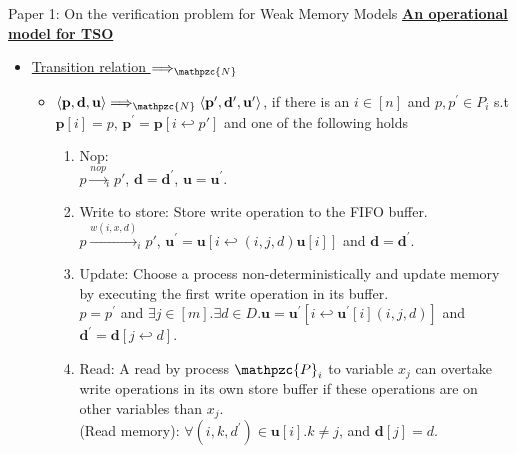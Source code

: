 \documentclass[9pt]{beamer}
\begin{document}
\begin{frame}{Paper 1: On the verification problem for Weak Memory Models}
\underline{\textbf{An operational model for TSO}}\\
\begin{itemize}
\item \underline{Transition relation $\Longrightarrow_\mathpzc{N}$}
\begin{itemize}
\item $\langle \mathbf{p}, \mathbf{d}, \mathbf{u}\rangle \Longrightarrow_\mathpzc{N} \langle \mathbf{p^{\prime}}, \mathbf{d^{\prime}}, \mathbf{u^{\prime}} \rangle$,
      if there is an $i \in [n]$ and $p, p^{\prime} \in P_i$ s.t $\mathbf{p}[i] = p$,
			$\mathbf{p^{\prime}} = \mathbf{p}[i \hookleftarrow p{\prime}]$ and one of the following holds
			\begin{enumerate}
			\item Nop:\\
			\vspace{2mm}
				    $p \overset{nop}{\longrightarrow}_i p{\prime}$, $\mathbf{d} = \mathbf{d^{\prime}}$, $\mathbf{u} = \mathbf{u^{\prime}}$.
			\vspace{2mm}
			\item Write to store: Store write operation to the FIFO buffer.\\
			\vspace{2mm}
						$p \overset{w(i,x,d)}{\longrightarrow}_i p{\prime}$, $\mathbf{u^{\prime}} = \mathbf{u}[i \hookleftarrow (i,j,d)\mathbf{u}[i]]$
						and $\mathbf{d} = \mathbf{d^{\prime}}$.
			\vspace{2mm}
			\item Update: Choose a process non-deterministically and update memory by executing the first write operation
										in its buffer.\\
			\vspace{2mm}
						$p = p^{\prime}$ and $\exists j \in [m].\exists d \in D.\mathbf{u} = \mathbf{u}^{\prime}[i \hookleftarrow
						\mathbf{u}^{\prime}[i](i,j,d)]$ and $\mathbf{d}^{\prime} = \mathbf{d}[j \hookleftarrow d]$.
			\vspace{2mm}
			\item Read: A read by process $\mathpzc{P}_i$ to variable $x_j$ can overtake write operations in its own store
						buffer if these operations are on other variables than $x_j$.\\
			\vspace{2mm}
						(Read memory): $\forall (i,k,d^{\prime}) \in \mathbf{u}[i].k \neq j$, and $\mathbf{d}[j] = d$.\\

\end{enumerate}
\end{itemize}
\end{itemize}
\end{frame}
\end{document}
